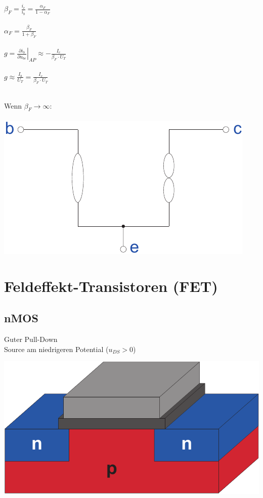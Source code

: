 \documentclass[a4paper,twocolumn,10pt]{article}
\begin{document}
\begin{minipage}[t]{0.23\textwidth}
$\beta_F=\frac{i_c}{i_b}=\frac{\alpha_F}{1-\alpha_F}$\\\\
$\alpha_F=\frac{\beta_F}{1+\beta_F}$\\\\
$g=\left.\frac{\partial i_b}{\partial u_{be}}\right|_{AP}\approx -\frac{I_e}{\beta_F\cdot U_T}$\\\\
$g\approx \frac{I_b}{U_T}=\frac{I_c}{\beta_F\cdot U_T}$\\\\
\end{minipage}
\hfill
\begin{minipage}[t]{0.23\textwidth}
Wenn $\beta_F \rightarrow \infty$:\\\\
\includegraphics[width=\textwidth]{Grafiken/Nullormodell}
\end{minipage}

\section*{Feldeffekt-Transistoren (FET)}
\subsection*{nMOS}

\begin{minipage}[b]{0.35\textwidth}
Guter Pull-Down\\
Source am niedrigeren Potential ($u_{DS} > 0$)
\end{minipage}
\hfill
\begin{minipage}[b]{0.1\textwidth}
\centering
\includegraphics[width=\textwidth]{Grafiken/nMOS}
\end{minipage}
\end{document}
